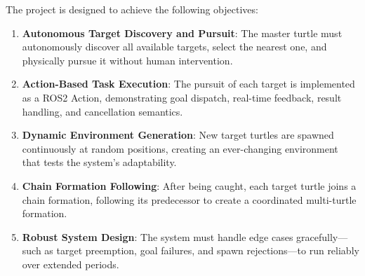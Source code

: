 \documentclass{article}
\begin{document}
\begin{homeworkProblem}[1]
The project is designed to achieve the following objectives:

\begin{enumerate}[label=\textbf{O\arabic*:}]
  \item \textbf{Autonomous Target Discovery and Pursuit}: The master turtle must autonomously discover all available targets, select the nearest one, and physically pursue it without human intervention.

  \item \textbf{Action-Based Task Execution}: The pursuit of each target is implemented as a ROS2 Action, demonstrating goal dispatch, real-time feedback, result handling, and cancellation semantics.

  \item \textbf{Dynamic Environment Generation}: New target turtles are spawned continuously at random positions, creating an ever-changing environment that tests the system's adaptability.

  \item \textbf{Chain Formation Following}: After being caught, each target turtle joins a chain formation, following its predecessor to create a coordinated multi-turtle formation.

  \item \textbf{Robust System Design}: The system must handle edge cases gracefully---such as target preemption, goal failures, and spawn rejections---to run reliably over extended periods.
\end{enumerate}

\end{homeworkProblem}
\end{document}
